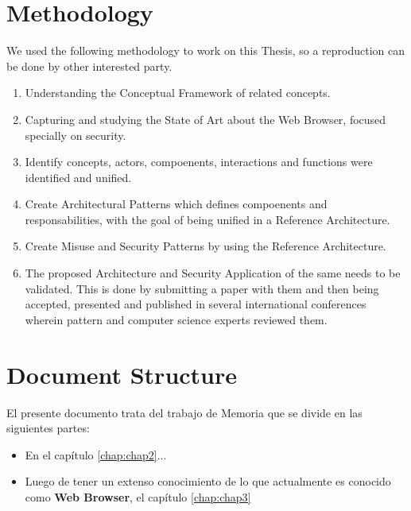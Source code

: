 \section{Methodology}
\label{chap1:Met}
We used the following methodology to work on this Thesis, so a reproduction can be done by other interested party.
\begin{enumerate}
	\item Understanding the Conceptual Framework of related concepts.
	\item Capturing and studying the State of Art about the Web Browser, focused specially on security.
	\item Identify concepts, actors, compoenents, interactions and functions were identified and unified.
	\item Create Architectural Patterns which defines compoenents and responsabilities, with the goal of being unified in a Reference Architecture.
	\item Create Misuse and Security Patterns by using the Reference Architecture.
	\item The proposed Architecture and Security Application of the same needs to be validated. This is done by submitting a paper with them and then being accepted, presented and published in several international conferences wherein pattern and computer science experts reviewed them.
\end{enumerate}




\section{Document Structure}
\label{chap1:estruct}

El presente documento trata del trabajo de Memoria que se divide en las siguientes partes:

\begin{itemize}
	\item En el capítulo \ref{chap:chap2}... %
	\item Luego de tener un extenso conocimiento de lo que actualmente es conocido como \textbf{Web Browser}, el capítulo \ref{chap:chap3}
\end{itemize}












